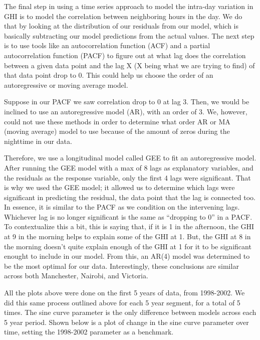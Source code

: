 \documentclass[
  letterpaper,
  DIV=11,
  numbers=noendperiod]{scrartcl}
\begin{document}
The final step in using a time series approach to model the intra-day
variation in GHI is to model the correlation between neighboring hours
in the day. We do that by looking at the distribution of our residuals
from our model, which is basically subtracting our model predictions
from the actual values. The next step is to use tools like an
autocorrelation function (ACF) and a partial autocorrelation function
(PACF) to figure out at what lag does the correlation between a given
data point and the lag X (X being what we are trying to find) of that
data point drop to 0. This could help us choose the order of an
autoregressive or moving average model.

Suppose in our PACF we saw correlation drop to 0 at lag 3. Then, we
would be inclined to use an autoregressive model (AR), with an order of
3. We, however, could not use these methods in order to determine what
order AR or MA (moving average) model to use because of the amount of
zeros during the nighttime in our data.

Therefore, we use a longitudinal model called GEE to fit an
autoregressive model. After running the GEE model with a max of 8 lags
as explanatory variables, and the residuals as the response variable,
only the first 4 lags were significant. That is why we used the GEE
model; it allowed us to determine which lags were significant in
predicting the residual, the data point that the lag is connected too.
In essence, it is similar to the PACF as we condition on the intervening
lags. Whichever lag is no longer significant is the same as ``dropping
to 0'' in a PACF. To contextualize this a bit, this is saying that, if
it is 1 in the afternoon, the GHI at 9 in the morning helps to explain
some of the GHI at 1. But, the GHI at 8 in the morning doesn't quite
explain enough of the GHI at 1 for it to be significant enought to
include in our model. From this, an AR(4) model was determined to be the
most optimal for our data. Interestingly, these conclusions are similar
across both Manchester, Nairobi, and Victoria.

All the plots above were done on the first 5 years of data, from
1998-2002. We did this same process outlined above for each 5 year
segment, for a total of 5 times. The sine curve parameter is the only
difference between models across each 5 year period. Shown below is a
plot of change in the sine curve parameter over time, setting the
1998-2002 parameter as a benchmark.
\end{document}
